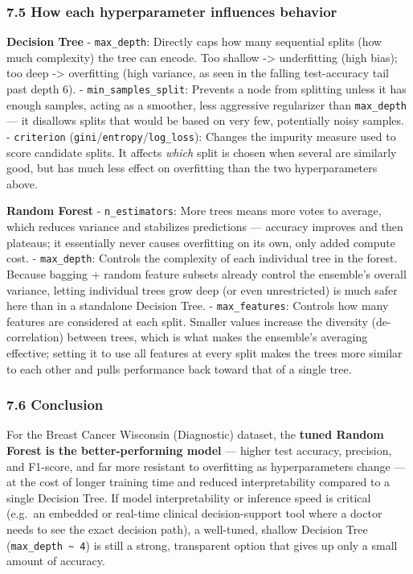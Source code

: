 \documentclass[11pt]{article}
\begin{document}
\subsubsection{7.5 How each hyperparameter influences
behavior}\label{how-each-hyperparameter-influences-behavior}

\textbf{Decision Tree} - \texttt{max\_depth}: Directly caps how many
sequential splits (how much complexity) the tree can encode. Too shallow
-\textgreater{} underfitting (high bias); too deep -\textgreater{}
overfitting (high variance, as seen in the falling test-accuracy tail
past depth 6). - \texttt{min\_samples\_split}: Prevents a node from
splitting unless it has enough samples, acting as a smoother, less
aggressive regularizer than \texttt{max\_depth} --- it disallows splits
that would be based on very few, potentially noisy samples. -
\texttt{criterion} (\texttt{gini}/\texttt{entropy}/\texttt{log\_loss}):
Changes the impurity measure used to score candidate splits. It affects
\emph{which} split is chosen when several are similarly good, but has
much less effect on overfitting than the two hyperparameters above.

\textbf{Random Forest} - \texttt{n\_estimators}: More trees means more
votes to average, which reduces variance and stabilizes predictions ---
accuracy improves and then plateaus; it essentially never causes
overfitting on its own, only added compute cost. - \texttt{max\_depth}:
Controls the complexity of each individual tree in the forest. Because
bagging + random feature subsets already control the ensemble's overall
variance, letting individual trees grow deep (or even unrestricted) is
much safer here than in a standalone Decision Tree. -
\texttt{max\_features}: Controls how many features are considered at
each split. Smaller values increase the diversity (de-correlation)
between trees, which is what makes the ensemble's averaging effective;
setting it to use all features at every split makes the trees more
similar to each other and pulls performance back toward that of a single
tree.

\subsubsection{7.6 Conclusion}\label{conclusion}

For the Breast Cancer Wisconsin (Diagnostic) dataset, the \textbf{tuned
Random Forest is the better-performing model} --- higher test accuracy,
precision, and F1-score, and far more resistant to overfitting as
hyperparameters change --- at the cost of longer training time and
reduced interpretability compared to a single Decision Tree. If model
interpretability or inference speed is critical (e.g.~an embedded or
real-time clinical decision-support tool where a doctor needs to see the
exact decision path), a well-tuned, shallow Decision Tree
(\texttt{max\_depth\ \textasciitilde{}\ 4}) is still a strong,
transparent option that gives up only a small amount of accuracy.


    
    
    
\end{document}
